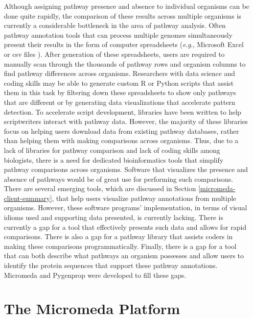Although assigning pathway presence and absence to individual organisms can be 
done quite rapidly, the comparison of these results across multiple organisms is 
currently a considerable bottleneck in the area of pathway analysis. Often 
pathway annotation tools that can process multiple genomes simultaneously 
present their results in the form of computer spreadsheets 
(\textit{e}.\textit{g}., Microsoft Excel or \gls{csv} files \cite{RFC4180}). 
After generation of these spreadsheets, users are required to manually scan 
through the thousands of pathway rows and organism columns to find pathway 
differences across organisms. Researchers with data science and coding skills 
may be able to generate custom R or Python scripts that assist them in this task 
by filtering down these spreadsheets to show only pathways that are different or 
by generating data visualizations that accelerate pattern detection. To 
accelerate script development, libraries have been written to help scriptwriters 
interact with pathway data. However, the majority of these libraries focus on 
helping users download data from existing pathway databases, rather than helping 
them with making comparisons across organisms. Thus, due to a lack of libraries 
for pathway comparison and lack of coding skills among biologists, there is a 
need for dedicated bioinformatics tools that simplify pathway comparisons across 
organisms. Software that visualizes the presence and absence of pathways would 
be of great use for performing such comparisons. There are several emerging 
tools, which are discussed in Section \ref{micromeda-client-summary}, that help 
users visualize pathway annotations from multiple organisms. However, these 
software programs' implementation, in terms of visual idioms used and supporting 
data presented, is currently lacking. There is currently a gap for a tool that 
effectively presents such data and allows for rapid comparisons. There is also a 
gap for a pathway library that assists coders in making these comparisons 
programmatically. Finally, there is a gap for a tool that can both describe what 
pathways an organism possesses and allow users to identify the protein sequences 
that support these pathway annotations. Micromeda and Pygenprop were developed 
to fill these gaps.

\section{The Micromeda Platform} \label{micromeda-overview}

